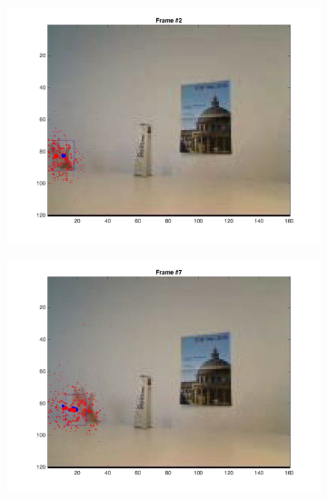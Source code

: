 \documentclass{ethz_report}
\begin{document}
\begin{figure}[h]
    \centering
    \begin{subfigure}[b]{.25\textwidth}
        \centering
        \includegraphics[width=1\linewidth]{images/video2_observe_high_1}
    \end{subfigure}%
    \begin{subfigure}[b]{.25\textwidth}
        \centering
        \includegraphics[width=1\linewidth]{images/video2_observe_high_6}
    \end{subfigure}%
    \begin{subfigure}[b]{.25\textwidth}
        \centering

\end{subfigure}
\end{figure}
\end{document}
